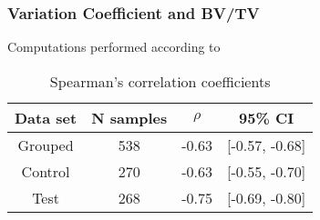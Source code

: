 \documentclass[xcolor=table]{beamer}
\begin{document}

\begin{frame}
	\frametitle{Variation Coefficient and BV/TV}
	Computations performed according to \cite{p2}
	\begin{table}[h!]
	\centering
	\caption{Spearman's correlation coefficients}\label{}
		\begin{tabular}{cccc}
			\toprule
			Data set & N samples & $\rho$ & 95\% CI \\
			\midrule
			Grouped & 538 & -0.63 & [-0.57, -0.68] \\
			Control & 270 & -0.63 & [-0.55, -0.70] \\
			Test & 268 & -0.75 & [-0.69, -0.80] \\
			\bottomrule
		\end{tabular}
	\end{table}
\end{frame}

\end{document}

